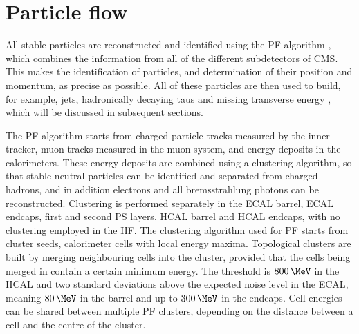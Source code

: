 \section{Particle flow}
\label{sec:objects_pf}
All stable particles are reconstructed and identified using the \ac{PF} algorithm \cite{cms-pf-2009,cms-pf-2010-commfirst,cms-pf-2010-2}, which
combines the information from all of the different subdetectors of \ac{CMS}. This makes
the identification of particles, and determination of their position and momentum, as precise
as possible. All of these particles are then used to build, for example, jets, hadronically decaying taus and missing transverse
energy \MET, which will be discussed in subsequent sections.

The \ac{PF} algorithm starts from charged particle tracks measured
by the inner tracker, muon tracks measured in the muon system, and 
energy deposits in the calorimeters. These energy deposits are combined
using a clustering algorithm, so that stable neutral particles can be identified and
separated from charged hadrons, and in addition electrons and all bremsstrahlung photons
can be reconstructed. Clustering is performed separately in the \ac{ECAL} barrel,
\ac{ECAL} endcaps, first and second \ac{PS} layers, \ac{HCAL} barrel and \ac{HCAL} endcaps, with no 
clustering employed in the \ac{HF}.
The clustering algorithm used for \ac{PF} starts from cluster seeds,
calorimeter cells with local energy maxima. Topological clusters are built by 
merging neighbouring cells into the cluster, provided that the cells
being merged in contain a certain minimum energy.
The threshold is $800\,\MeV$ in the \ac{HCAL} and two standard deviations above the
expected noise level in the \ac{ECAL}, meaning $80\,\MeV$ in the barrel and up 
to $300\,\MeV$ in the endcaps. Cell energies can be shared between multiple
\ac{PF} clusters, depending on the distance between a cell and the centre of the cluster.

